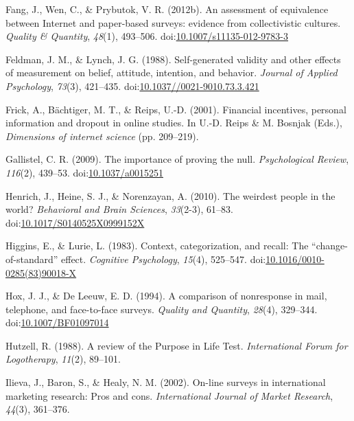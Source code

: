 \documentclass[english,man]{apa6}
\theoremstyle{definition}
\theoremstyle{definition}
\theoremstyle{definition}
\theoremstyle{remark}
\begin{document}
\hypertarget{ref-Fang2012}{}
Fang, J., Wen, C., \& Prybutok, V. R. (2012b). An assessment of
equivalence between Internet and paper-based surveys: evidence from
collectivistic cultures. \emph{Quality \& Quantity}, \emph{48}(1),
493--506.
doi:\href{https://doi.org/10.1007/s11135-012-9783-3}{10.1007/s11135-012-9783-3}

\hypertarget{ref-Feldman1988}{}
Feldman, J. M., \& Lynch, J. G. (1988). Self-generated validity and
other effects of measurement on belief, attitude, intention, and
behavior. \emph{Journal of Applied Psychology}, \emph{73}(3), 421--435.
doi:\href{https://doi.org/10.1037//0021-9010.73.3.421}{10.1037//0021-9010.73.3.421}

\hypertarget{ref-Frick2001}{}
Frick, A., Bächtiger, M. T., \& Reips, U.-D. (2001). Financial
incentives, personal information and dropout in online studies. In U.-D.
Reips \& M. Bosnjak (Eds.), \emph{Dimensions of internet science} (pp.
209--219).

\hypertarget{ref-Gallistel2009}{}
Gallistel, C. R. (2009). The importance of proving the null.
\emph{Psychological Review}, \emph{116}(2), 439--53.
doi:\href{https://doi.org/10.1037/a0015251}{10.1037/a0015251}

\hypertarget{ref-Henrich2010}{}
Henrich, J., Heine, S. J., \& Norenzayan, A. (2010). The weirdest people
in the world? \emph{Behavioral and Brain Sciences}, \emph{33}(2-3),
61--83.
doi:\href{https://doi.org/10.1017/S0140525X0999152X}{10.1017/S0140525X0999152X}

\hypertarget{ref-Higgins1983}{}
Higgins, E., \& Lurie, L. (1983). Context, categorization, and recall:
The ``change-of-standard'' effect. \emph{Cognitive Psychology},
\emph{15}(4), 525--547.
doi:\href{https://doi.org/10.1016/0010-0285(83)90018-X}{10.1016/0010-0285(83)90018-X}

\hypertarget{ref-Hox1994}{}
Hox, J. J., \& De Leeuw, E. D. (1994). A comparison of nonresponse in
mail, telephone, and face-to-face surveys. \emph{Quality and Quantity},
\emph{28}(4), 329--344.
doi:\href{https://doi.org/10.1007/BF01097014}{10.1007/BF01097014}

\hypertarget{ref-Hutzell1988}{}
Hutzell, R. (1988). A review of the Purpose in Life Test.
\emph{International Forum for Logotherapy}, \emph{11}(2), 89--101.

\hypertarget{ref-Ilieva2001}{}
Ilieva, J., Baron, S., \& Healy, N. M. (2002). On-line surveys in
international marketing research: Pros and cons. \emph{International
Journal of Market Research}, \emph{44}(3), 361--376.
\end{document}
